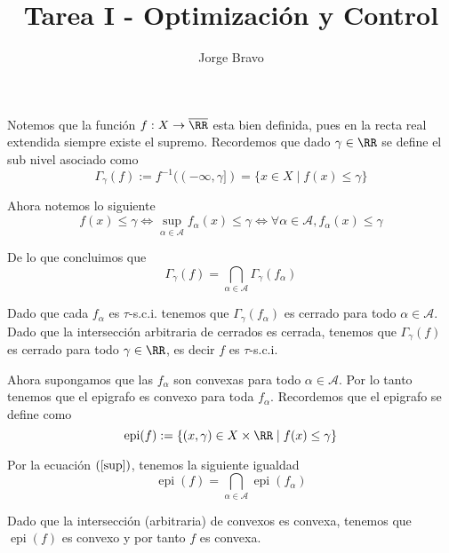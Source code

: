 \documentclass[a4paper,oneside,10.5pt]{USMArt}
\title{Tarea I - Optimización y Control}
\author{Jorge Bravo}
\DeclareMathOperator{\epi}{epi}
\begin{document}
\maketitle

\begin{sol}
  Notemos que la función $f : X \to \overline{\RR}$ esta bien definida, pues en la recta real extendida siempre existe
  el supremo. Recordemos que dado $\gamma \in \RR$ se define el sub nivel asociado como
  \begin{equation*}
    \Gamma_{\gamma}(f) := f^{-1}((-\infty, \gamma]) = \{ x \in X \; | \; f(x) \leq \gamma\}
  \end{equation*}

  Ahora notemos lo siguiente
  \begin{equation}
    \label{sup}
    f(x) \leq \gamma \iff \sup_{\alpha \in \mathcal{A}} f_{\alpha}(x) \leq \gamma \iff \forall \alpha \in \mathcal{A}, f_{\alpha}(x) \leq \gamma
  \end{equation}

  De lo que concluimos que
  \begin{equation*}
    \Gamma_{\gamma}(f) = \bigcap_{\alpha \in \mathcal{A}} \Gamma_{\gamma}(f_{\alpha})
  \end{equation*}

  Dado que cada $f_{\alpha}$ es $\tau$-s.c.i.  tenemos que $\Gamma_{\gamma}(f_{\alpha})$ es cerrado para todo $\alpha \in \mathcal{A}$. Dado que la intersección arbitraria de cerrados es cerrada, tenemos que $\Gamma_{\gamma}(f)$ es cerrado
  para todo $\gamma \in \RR$, es decir $f$ es $\tau$-s.c.i.

  Ahora supongamos que las $f_{\alpha}$ son convexas para todo $\alpha \in \mathcal{A}$. Por lo tanto tenemos que el epigrafo es convexo para toda $f_{\alpha}$. Recordemos que el epigrafo se define como
  \begin{equation*}
    \epi(f) := \{ (x, \gamma) \in X \times \RR \; | \; f(x) \leq \gamma\}
  \end{equation*}

  Por la ecuación $(\ref{sup})$, tenemos la siguiente igualdad
  \begin{equation*}
    \epi(f) = \bigcap_{\alpha \in \mathcal{A}} \epi(f_{\alpha})
  \end{equation*}

  Dado que la intersección (arbitraria) de convexos es convexa, tenemos que $\epi(f)$ es convexo y por tanto $f$ es convexa.
\end{sol}
\end{document}
